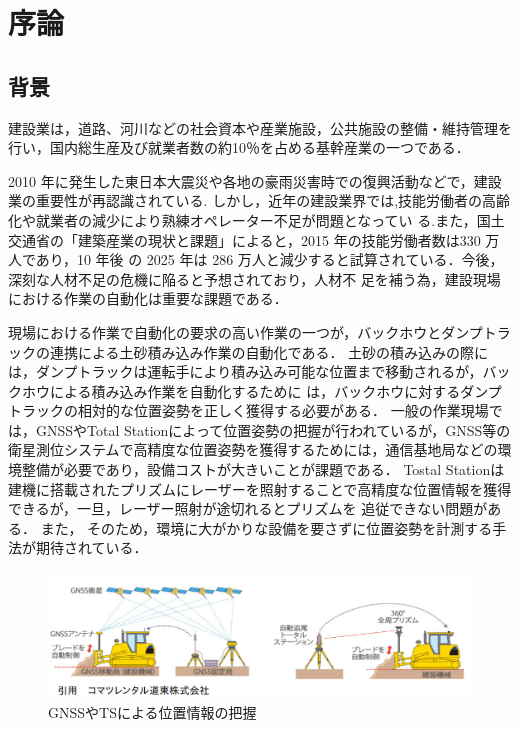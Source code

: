 \chapter{序論}
\thispagestyle{empty}
\label{Chap1}
\minitoc

\newpage

\section{背景}
\label{Background}
建設業は，道路、河川などの社会資本や産業施設，公共施設の整備・維持管理を行い，国内総生産及び就業者数の約10％を占める基幹産業の一つである．\cite{日本建設組合連合2016}
\par 2010 年に発生した東日本大震災や各地の豪雨災害時での復興活動などで，建設業の重要性が再認識されている.
しかし，近年の建設業界では,技能労働者の高齢化や就業者の減少により熟練オペレーター不足が問題となってい
る.また，国土交通省の「建築産業の現状と課題」\cite{建設経済研究所2017}によると，2015 年の技能労働者数は330 万人であり，10 年後
の 2025 年は 286 万人と減少すると試算されている．今後，深刻な人材不足の危機に陥ると予想されており，人材不
足を補う為，建設現場における作業の自動化は重要な課題である．
\par
現場における作業で自動化の要求の高い作業の一つが，バックホウとダンプトラックの連携による土砂積み込み作業の自動化である．
土砂の積み込みの際には，ダンプトラックは運転手により積み込み可能な位置まで移動されるが，バックホウによる積み込み作業を自動化するために
は，バックホウに対するダンプトラックの相対的な位置姿勢を正しく獲得する必要がある．
一般の作業現場では，GNSSやTotal Stationによって位置姿勢の把握\cite{土井下2010}が行われているが，GNSS等の衛星測位システムで高精度な位置姿勢を獲得するためには，通信基地局などの環境整備が必要であり，設備コストが大きいことが課題である．
Tostal Stationは建機に搭載されたプリズムにレーザーを照射することで高精度な位置情報を獲得できるが，一旦，レーザー照射が途切れるとプリズムを
追従できない問題がある．
また，
そのため，環境に大がかりな設備を要さずに位置姿勢を計測する手法が期待されている．
\begin{figure}[b]
 \begin{center}
 \includegraphics[width=1.0\columnwidth]{./chap1/fig/GNSS.png}
 \caption{GNSSやTSによる位置情報の把握}
 \label{fig:GNSS}
 \end{center}
\end{figure}

